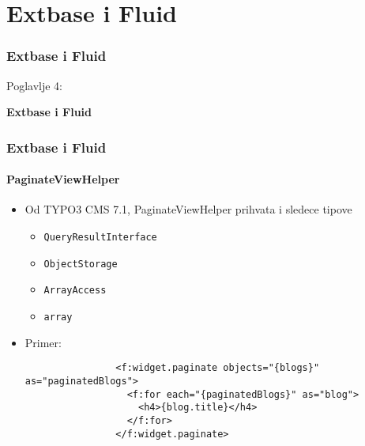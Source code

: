 %

\section{Extbase i Fluid}
\begin{frame}[fragile]
	\frametitle{Extbase i Fluid}

	\begin{center}\huge{Poglavlje 4:}\end{center}
	\begin{center}\huge{\color{typo3darkgrey}\textbf{Extbase i Fluid}}\end{center}

\end{frame}


\begin{frame}[fragile]
	\frametitle{Extbase i Fluid}
	\framesubtitle{PaginateViewHelper}

	\begin{itemize}

		\item Od TYPO3 CMS 7.1, PaginateViewHelper prihvata i sledece tipove

			\begin{itemize}
				\item \texttt{QueryResultInterface}
				\item \texttt{ObjectStorage}
				\item \texttt{ArrayAccess}
				\item \texttt{array}
			\end{itemize}

		\item Primer:

			\begin{lstlisting}
				<f:widget.paginate objects="{blogs}" as="paginatedBlogs">
				  <f:for each="{paginatedBlogs}" as="blog">
				    <h4>{blog.title}</h4>
				  </f:for>
				</f:widget.paginate>
			\end{lstlisting}

	\end{itemize}

\end{frame}

